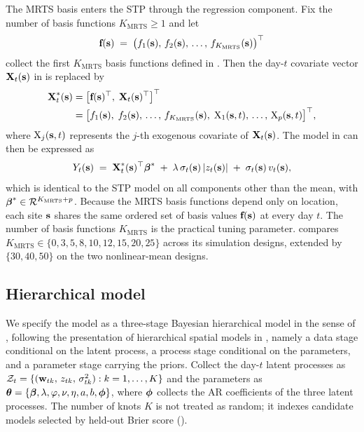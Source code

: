 \documentclass[12pt]{article}
\begin{document}
The MRTS basis enters the STP through the regression component. Fix the number of basis functions $K_{\mathrm{MRTS}} \ge 1$ and let
\begin{align}
 \mbox{\bf f}(\mbox{\bf s}) \;=\; \big(f_1(\mbox{\bf s}),\, f_2(\mbox{\bf s}),\, \ldots,\, f_{K_{\mathrm{MRTS}}}(\mbox{\bf s})\big)^\top
 \label{eq:mrts-f}
\end{align}
collect the first $K_{\mathrm{MRTS}}$ basis functions defined in . Then the day-$t$ covariate vector $\mbox{\bf X}_t(\mbox{\bf s})$ in  is replaced by
\begin{align}
 \mbox{\bf X}^*_t(\mbox{\bf s})
 &= \big[\mbox{\bf f}(\mbox{\bf s})^\top,\; \mbox{\bf X}_t(\mbox{\bf s})^\top\big]^\top \notag\\
 &= \big[f_1(\mbox{\bf s}),\; f_2(\mbox{\bf s}),\, \ldots,\, f_{K_{\mathrm{MRTS}}}(\mbox{\bf s}),\; \mathrm{X}_1(\mbox{\bf s}, t),\, \ldots,\, \mathrm{X}_p(\mbox{\bf s}, t)\big]^\top,
 \label{eq:mrts-augmented}
\end{align}
where $\mathrm{X}_j(\mbox{\bf s}, t)$ represents the $j$-th exogenous covariate of $\mbox{\bf X}_t(\mbox{\bf s})$. The model in  can then be expressed as
\begin{align}
  Y_t(\mbox{\bf s}) \;=\; \mbox{\bf X}^*_t(\mbox{\bf s})^\top \mbox{\boldmath $\beta$}^* \;+\; \lambda\, \sigma_t(\mbox{\bf s})\, |z_t(\mbox{\bf s})| \;+\; \sigma_t(\mbox{\bf s})\, v_t(\mbox{\bf s}),
  \label{eq:fullmodel-mrts}
\end{align}
which is identical to the STP model  on all components other than the mean, with $\mbox{\boldmath $\beta$}^* \in {\cal R}^{K_{\mathrm{MRTS}} + p}$.  Because the MRTS basis functions depend only on location, each site $\mbox{\bf s}$ shares the same ordered set of basis values $\mbox{\bf f}(\mbox{\bf s})$ at every day $t$.  The number of basis functions $K_{\mathrm{MRTS}}$ is the practical tuning parameter.   compares $K_{\mathrm{MRTS}} \in \{0, 3, 5, 8, 10, 12, 15, 20, 25\}$ across its simulation designs, extended by $\{30, 40, 50\}$ on the two nonlinear-mean designs.

\subsection{Hierarchical model}\label{sec:meth-hier}

We specify the model as a three-stage Bayesian hierarchical model in the sense
of \textcite{berliner_hierarchical_1996}, following the presentation of hierarchical spatial models
in \textcite{gelfand_handbook_2010}, namely a data stage conditional on the
latent process, a process stage conditional on the parameters, and a parameter
stage carrying the priors.  Collect the day-$t$ latent processes as
${\cal Z}_t = \{(\mbox{\bf w}_{tk},\, z_{tk},\, \sigma^2_{tk}) : k = 1, \ldots, K\}$ and the
parameters as $\mbox{\boldmath $\theta$} = \{\mbox{\boldmath $\beta$}, \lambda, \varphi, \nu, \eta, a, b, \mbox{\boldmath $\phi$}\}$,
where $\mbox{\boldmath $\phi$}$ collects the AR coefficients of the three latent processes.  The
number of knots $K$ is not treated as random; it indexes candidate models
selected by held-out Brier score ().
\end{document}

